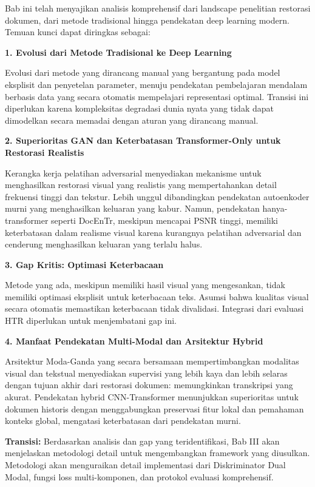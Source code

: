 \documentclass[12pt,a4paper]{article}
\begin{document}
Bab ini telah menyajikan analisis komprehensif dari landscape penelitian restorasi dokumen, dari metode tradisional hingga pendekatan deep learning modern. Temuan kunci dapat diringkas sebagai:

\textbf{1. Evolusi dari Metode Tradisional ke Deep Learning}

Evolusi dari metode yang dirancang manual yang bergantung pada model eksplisit dan penyetelan parameter, menuju pendekatan pembelajaran mendalam berbasis data yang secara otomatis mempelajari representasi optimal. Transisi ini diperlukan karena kompleksitas degradasi dunia nyata yang tidak dapat dimodelkan secara memadai dengan aturan yang dirancang manual.

\textbf{2. Superioritas GAN dan Keterbatasan Transformer-Only untuk Restorasi Realistis}

Kerangka kerja pelatihan adversarial menyediakan mekanisme untuk menghasilkan restorasi visual yang realistis yang mempertahankan detail frekuensi tinggi dan tekstur. Lebih unggul dibandingkan pendekatan autoenkoder murni yang menghasilkan keluaran yang kabur. Namun, pendekatan hanya-transformer seperti DocEnTr, meskipun mencapai PSNR tinggi, memiliki keterbatasan dalam realisme visual karena kurangnya pelatihan adversarial dan cenderung menghasilkan keluaran yang terlalu halus.

\textbf{3. Gap Kritis: Optimasi Keterbacaan}

Metode yang ada, meskipun memiliki hasil visual yang mengesankan, tidak memiliki optimasi eksplisit untuk keterbacaan teks. Asumsi bahwa kualitas visual secara otomatis memastikan keterbacaan tidak divalidasi. Integrasi dari evaluasi HTR diperlukan untuk menjembatani gap ini.

\textbf{4. Manfaat Pendekatan Multi-Modal dan Arsitektur Hybrid}

Arsitektur Moda-Ganda yang secara bersamaan mempertimbangkan modalitas visual dan tekstual menyediakan supervisi yang lebih kaya dan lebih selaras dengan tujuan akhir dari restorasi dokumen: memungkinkan transkripsi yang akurat. Pendekatan hybrid CNN-Transformer menunjukkan superioritas untuk dokumen historis dengan menggabungkan preservasi fitur lokal dan pemahaman konteks global, mengatasi keterbatasan dari pendekatan murni.

\textbf{Transisi:} Berdasarkan analisis dan gap yang teridentifikasi, Bab III akan menjelaskan metodologi detail untuk mengembangkan framework yang diusulkan. Metodologi akan menguraikan detail implementasi dari Diskriminator Dual Modal, fungsi loss multi-komponen, dan protokol evaluasi komprehensif.
\end{document}
